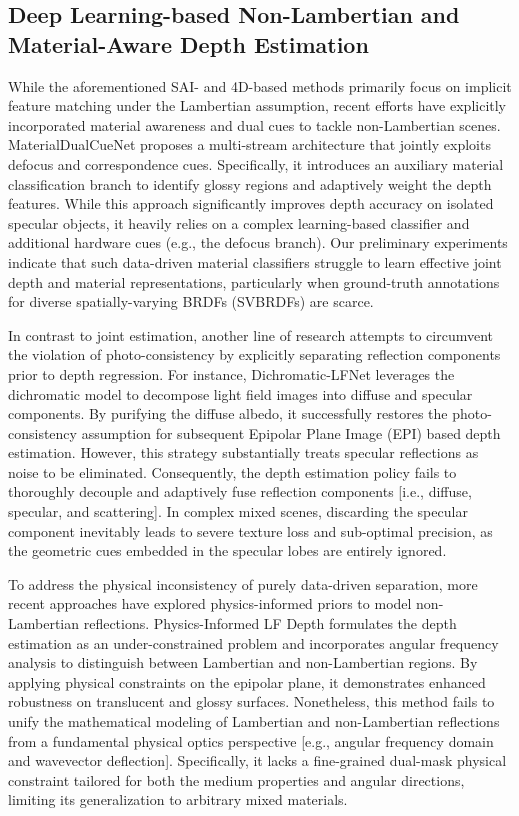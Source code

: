\documentclass[lettersize,journal]{IEEEtran}
\begin{document}
\subsection{Deep Learning-based Non-Lambertian and Material-Aware Depth Estimation}

While the aforementioned SAI- and 4D-based methods primarily focus on implicit feature matching under the Lambertian assumption, recent efforts have explicitly incorporated material awareness and dual cues to tackle non-Lambertian scenes. MaterialDualCueNet \cite{MaterialDualCueNetdualcuesd} proposes a multi-stream architecture that jointly exploits defocus and correspondence cues. Specifically, it introduces an auxiliary material classification branch to identify glossy regions and adaptively weight the depth features. While this approach significantly improves depth accuracy on isolated specular objects, it heavily relies on a complex learning-based classifier and additional hardware cues (e.g., the defocus branch). Our preliminary experiments indicate that such data-driven material classifiers struggle to learn effective joint depth and material representations, particularly when ground-truth annotations for diverse spatially-varying BRDFs (SVBRDFs) are scarce.

In contrast to joint estimation, another line of research attempts to circumvent the violation of photo-consistency by explicitly separating reflection components prior to depth regression. For instance, Dichromatic-LFNet \cite{DichromaticLFNetdichromatic} leverages the dichromatic model to decompose light field images into diffuse and specular components. By purifying the diffuse albedo, it successfully restores the photo-consistency assumption for subsequent Epipolar Plane Image (EPI) based depth estimation. However, this strategy substantially treats specular reflections as noise to be eliminated. Consequently, the depth estimation policy fails to thoroughly decouple and adaptively fuse reflection components  [i.e., diffuse, specular, and scattering]. In complex mixed scenes, discarding the specular component inevitably leads to severe texture loss and sub-optimal precision, as the geometric cues embedded in the specular lobes are entirely ignored.

To address the physical inconsistency of purely data-driven separation, more recent approaches have explored physics-informed priors to model non-Lambertian reflections. Physics-Informed LF Depth \cite{PhysicsInformedLFDepthphys} formulates the depth estimation as an under-constrained problem and incorporates angular frequency analysis to distinguish between Lambertian and non-Lambertian regions. By applying physical constraints on the epipolar plane, it demonstrates enhanced robustness on translucent and glossy surfaces. Nonetheless, this method fails to unify the mathematical modeling of Lambertian and non-Lambertian reflections from a fundamental physical optics perspective  [e.g., angular frequency domain and wavevector deflection]. Specifically, it lacks a fine-grained dual-mask physical constraint tailored for both the medium properties and angular directions, limiting its generalization to arbitrary mixed materials.
\end{document}
